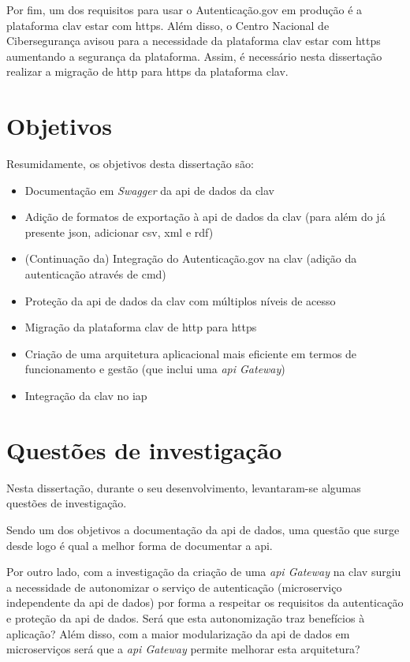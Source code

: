 Por fim, um dos requisitos para usar o Autenticação.gov em produção é a plataforma \acrshort{clav} estar com
\acrshort{https}. Além disso, o Centro Nacional de Cibersegurança avisou para a necessidade da plataforma \acrshort{clav}
estar com \acrshort{https} aumentando a segurança da plataforma. Assim, é necessário nesta dissertação realizar a 
migração de \acrshort{http} para \acrshort{https} da plataforma \acrshort{clav}.

\section{Objetivos}
Resumidamente, os objetivos desta dissertação são:

\begin{itemize}
    \item Documentação em \textit{Swagger} da \acrshort{api} de dados da \acrshort{clav}
    \item Adição de formatos de exportação à \acrshort{api} de dados da \acrshort{clav} (para além do já presente \acrshort{json}, adicionar \acrshort{csv}, \acrshort{xml} e \acrshort{rdf})
    \item (Continuação da) Integração do Autenticação.gov na \acrshort{clav} (adição da autenticação através de \acrlong{cmd})
    \item Proteção da \acrshort{api} de dados da \acrshort{clav} com múltiplos níveis de acesso
    \item Migração da plataforma \acrshort{clav} de \acrshort{http} para \acrshort{https}
    \item Criação de uma arquitetura aplicacional mais eficiente em termos de funcionamento e gestão (que inclui uma \textit{\acrshort{api} Gateway})
    \item Integração da \acrshort{clav} no \acrshort{iap}
\end{itemize}

\section{Questões de investigação}

Nesta dissertação, durante o seu desenvolvimento, levantaram-se algumas questões de investigação.

Sendo um dos objetivos a documentação da \acrshort{api} de dados, uma questão que surge desde logo é qual a melhor forma de documentar a \acrshort{api}.

Por outro lado, com a investigação da criação de uma \textit{\acrshort{api} Gateway} na \acrshort{clav} surgiu a
necessidade de autonomizar o serviço de autenticação (microserviço independente da \acrshort{api} de dados) por forma a
respeitar os requisitos da autenticação e proteção da \acrshort{api} de dados. Será que esta autonomização traz 
benefícios à aplicação? Além disso, com a maior modularização da \acrshort{api} de dados em microserviços será que a 
\textit{\acrshort{api} Gateway} permite melhorar esta arquitetura?

